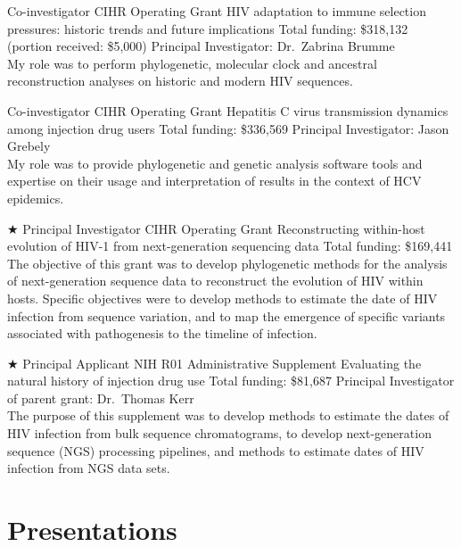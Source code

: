 \documentclass[11pt]{moderncv}
\begin{document}
{Co-investigator}
{CIHR Operating Grant}
{HIV adaptation to immune selection pressures: historic trends and future implications}
{Total funding: \$318,132 (portion received: \$5,000)}
{
Principal Investigator: Dr.~Zabrina Brumme\\
My role was to perform phylogenetic, molecular clock and ancestral reconstruction analyses on historic and modern HIV sequences.\\
}

{Co-investigator}
{CIHR Operating Grant}
{Hepatitis C virus transmission dynamics among injection drug users}
{Total funding: \$336,569}
{
Principal Investigator: Jason Grebely\\
My role was to provide phylogenetic and genetic analysis software tools and expertise on their usage and interpretation of results in the context of HCV epidemics.\\
}

{$\bigstar$ Principal Investigator}
{CIHR Operating Grant}
{Reconstructing within-host evolution of HIV-1 from next-generation sequencing data}
{Total funding: \$169,441}
{
The objective of this grant was to develop phylogenetic methods for the analysis of next-generation sequence data to reconstruct the evolution of HIV within hosts.
Specific objectives were to develop methods to estimate the date of HIV infection from sequence variation, and to map the emergence of specific variants associated with pathogenesis to the timeline of infection.\\
}


{$\bigstar$ Principal Applicant}
{NIH R01 Administrative Supplement}
{Evaluating the natural history of injection drug use}
{Total funding: \$81,687}
{
Principal Investigator of parent grant: Dr.~Thomas Kerr\\
The purpose of this supplement was to develop methods to estimate the dates of HIV infection from bulk sequence chromatograms, to develop next-generation sequence (NGS) processing pipelines, and methods to estimate dates of HIV infection from NGS data sets.\\
}






\section {Presentations}
\end{document}
